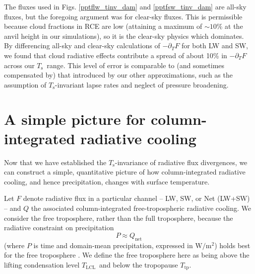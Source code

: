 \documentclass[10pt]{article}
\newcommand{\comment}[1]{\textcolor{blue}{[{#1}]}}
\newcommand{\beqn}{\begin{equation}}
\newcommand{\eeqn}{\end{equation}}
\newcommand{\ppt}{\ensuremath{\partial_T}}
\newcommand{\Qnet}{\ensuremath{Q_\mathrm{net}}}
\newcommand{\Fnet}{\ensuremath{F^\mathrm{net}}}
\newcommand{\Wmsq}{\ensuremath{\mathrm{W/m^2}}}
\newcommand{\Ts}{\ensuremath{T_\mathrm{s}}}
\newcommand{\Tlcl}{\ensuremath{T_\mathrm{LCL}}}
\newcommand{\Ttp}{\ensuremath{T_\mathrm{tp}}}
\begin{document}
The fluxes used in Figs.  \ref{pptflw_tinv_dam} and \ref{pptfsw_tinv_dam} are all-sky fluxes, but the foregoing argument was for clear-sky fluxes. This is permissible because cloud fractions in RCE are low (attaining a maximum of $\sim 10 \%$ at the anvil height in our simulations), so it is the clear-sky physics which dominates. By differencing all-sky and clear-sky calculations of  $-\ppt F$ for both LW and SW, we found that cloud radiative effects contribute a spread of about 10\% in $-\ppt F$ across our \Ts\ range. This level of error is comparable to (and sometimes compensated by)  that introduced by our other approximations, such as the assumption of \Ts-invariant lapse rates and neglect of pressure broadening.


%
%
%
%
 
		
\section{A simple picture for column-integrated radiative cooling} \label{sec_simple_Q}

Now that we have established  the \Ts-invariance of radiative flux divergences, we can construct a simple, quantitative picture of how column-integrated radiative cooling, and hence precipitation,  changes with surface temperature. 
	
	Let $F$ denote radiative flux in a particular channel -- LW, SW, or Net (LW+SW) -- and $Q$ the associated column-integrated free-tropospheric radiative cooling. We consider  the free troposphere, rather than the full troposphere, because the radiative constraint on precipitation 
		\beqn
			P \approx \Qnet
		\label{p_constraint}
		\eeqn
		 (where $P$ is time and domain-mean precipitation, expressed in \Wmsq) holds best for the free troposphere  \citep{ogorman2012}. We define the free troposphere here as being above the lifting condensation level \Tlcl\ and below the tropopause \Ttp.
	
\end{document}
